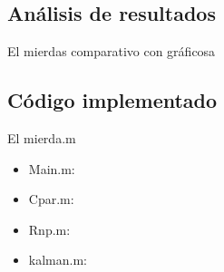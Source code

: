 \subsection{Análisis de resultados}
El mierdas comparativo con gráficosa
\subsection{Código implementado}
El mierda.m
\begin{itemize}
\item Main.m:
	
	
\item Cpar.m:
	
	
\item Rnp.m:
	
	
\item kalman.m:
	

\end{itemize}

